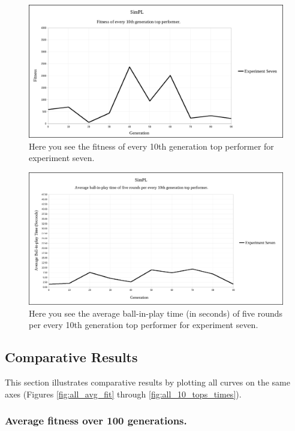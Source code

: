 \documentclass[a4paper,10pt]{article}
\begin{document}
\begin{figure}[H]  
  \centering
  \includegraphics[width=1\textwidth]{figures/exp7_10_tops.png}
  \caption{Here you see the fitness of every 10th generation top performer for experiment seven.}
  \label{fig:exp7_10_tops}
\end{figure}

\begin{figure}[H]  
  \centering
  \includegraphics[width=1\textwidth]{figures/exp7_10_tops_times.png}
  \caption{Here you see the average ball-in-play time (in seconds) of five rounds per every 10th generation top performer for experiment seven.}
  \label{fig:exp7_10_tops_times}
\end{figure}

\subsection{Comparative Results}

This section illustrates comparative results by plotting all curves on the same axes (Figures \ref{fig:all_avg_fit} through \ref{fig:all_10_tops_times}).

\subsubsection{Average fitness over 100 generations.}
\end{document}
